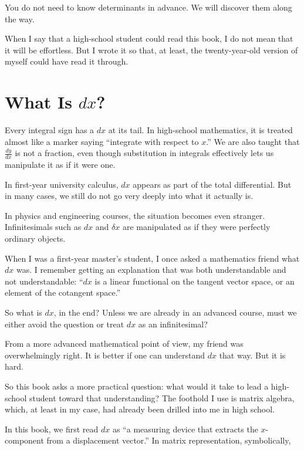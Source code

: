 You do not need to know determinants in advance. We will discover them
along the way.

When I say that a high-school student could read this book, I do not
mean that it will be effortless. But I wrote it so that, at least, the
twenty-year-old version of myself could have read it through.

\hypertarget{what-is-dx}{%
\section{\texorpdfstring{What Is
\(dx\)?}{What Is dx?}}\label{what-is-dx}}

Every integral sign has a \(dx\) at its tail. In high-school
mathematics, it is treated almost like a marker saying ``integrate with
respect to \(x\).'' We are also taught that \(\frac{dy}{dx}\) is not a
fraction, even though substitution in integrals effectively lets us
manipulate it as if it were one.

In first-year university calculus, \(dx\) appears as part of the total
differential. But in many cases, we still do not go very deeply into
what it actually is.

In physics and engineering courses, the situation becomes even stranger.
Infinitesimals such as \(dx\) and \(\delta x\) are manipulated as if
they were perfectly ordinary objects.

When I was a first-year master's student, I once asked a mathematics
friend what \(dx\) was. I remember getting an explanation that was both
understandable and not understandable: ``\(dx\) is a linear functional
on the tangent vector space, or an element of the cotangent space.''

So what is \(dx\), in the end? Unless we are already in an advanced
course, must we either avoid the question or treat \(dx\) as an
infinitesimal?

From a more advanced mathematical point of view, my friend was
overwhelmingly right. It is better if one can understand \(dx\) that
way. But it is hard.

So this book asks a more practical question: what would it take to lead
a high-school student toward that understanding? The foothold I use is
matrix algebra, which, at least in my case, had already been drilled
into me in high school.

In this book, we first read \(dx\) as ``a measuring device that extracts
the \(x\)-component from a displacement vector.'' In matrix
representation, symbolically,

